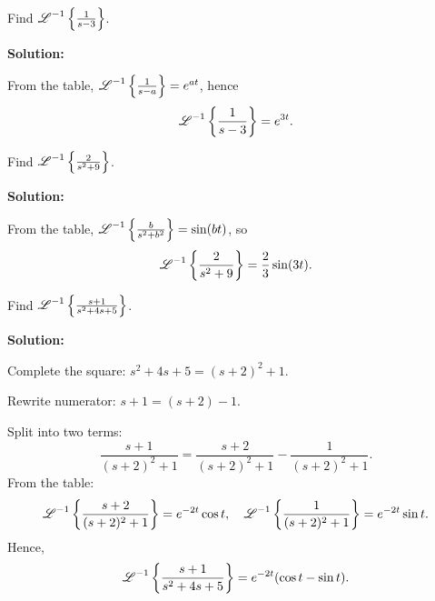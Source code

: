     \begin{example}
      Find $\operatorname{\mathscr{L}}^{-1}\left\{\frac{1}{s-3}\right\}$.

      \textbf{Solution:}
      
      From the table, $\operatorname{\mathscr{L}}^{-1}\left\{\frac{1}{s-a}\right\} = e^{at}$, hence
      \[
      \operatorname{\mathscr{L}}^{-1}\left\{\frac{1}{s-3}\right\} = e^{3t}.
      \]
    \end{example}


    \begin{example}
      Find $\operatorname{\mathscr{L}}^{-1}\left\{\frac{2}{s^2+9}\right\}$.

      \textbf{Solution:}
      
      From the table, $\operatorname{\mathscr{L}}^{-1}\left\{\frac{b}{s^2+b^2}\right\} = \sin(bt)$, so
      \[
      \operatorname{\mathscr{L}}^{-1}\left\{\frac{2}{s^2+9}\right\} = \frac{2}{3} \sin(3t).
      \]
    \end{example}


    \begin{example}
      Find $\operatorname{\mathscr{L}}^{-1}\left\{\frac{s+1}{s^2+4s+5}\right\}$.

      \textbf{Solution:}
      
      Complete the square: $s^2+4s+5 = (s+2)^2 + 1$.
      
      Rewrite numerator: $s+1 = (s+2) - 1$.

      Split into two terms:
      \[
      \frac{s+1}{(s+2)^2 + 1} = \frac{s+2}{(s+2)^2 +1} - \frac{1}{(s+2)^2+1}.
      \]  
      From the table:
      \[
      \operatorname{\mathscr{L}}^{-1}\left\{\frac{s+2}{(s+2)^2 +1}\right\} = e^{-2t}\cos t, \quad
      \operatorname{\mathscr{L}}^{-1}\left\{\frac{1}{(s+2)^2 +1}\right\} = e^{-2t}\sin t.
      \]  
      Hence,
      \[
      \operatorname{\mathscr{L}}^{-1}\left\{\frac{s+1}{s^2+4s+5}\right\} = e^{-2t} (\cos t - \sin t).
      \]
    \end{example}


    \begin{marginfigure}
        
    \end{marginfigure}



